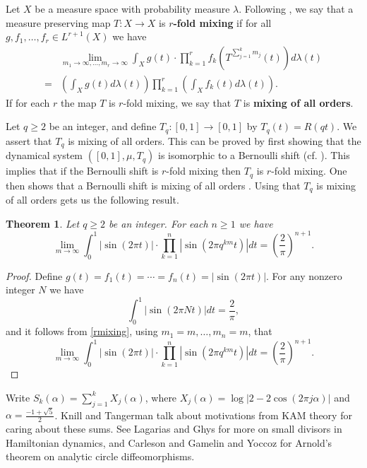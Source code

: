 \documentclass{amsart}
\newtheorem{theorem}{Theorem}
\begin{document}
Let $X$ be a measure space with probability measure $\lambda$. Following  \cite[p.~21, Definition 3.6]{EMS}, we say that a measure preserving map $T:X \to X$ is \textbf{$r$-fold mixing}
if for all $g,f_1,\ldots,f_r \in L^{r+1}(X)$ we have 
\begin{equation}
\begin{split}
&\lim_{m_1 \to \infty,\ldots,m_r \to \infty} \int_X g(t) \cdot \prod_{k=1}^r f_k\left(T^{\sum_{j=1}^k m_j}(t)\right) d\lambda(t)\\
=&\left(\int_X g(t) d\lambda(t)\right) \prod_{k=1}^r \left( \int_X f_k(t) d\lambda(t) \right).
\end{split}
\label{rmixing}
\end{equation}
If for each $r$ the map $T$ is $r$-fold mixing, we say that $T$ is \textbf{mixing of all orders}.

Let $q \geq 2$ be an integer, and define $T_q:[0,1] \to [0,1]$ by 
$T_q(t)=R(qt)$. We assert that $T_q$ is mixing of all orders. This can be proved by first showing that
the dynamical system $([0,1],\mu,T_q)$ is  isomorphic to a Bernoulli shift (cf. \cite[p.~17, Example 2.8]{einsiedler}). This implies that if the Bernoulli shift is $r$-fold mixing then
$T_q$ is $r$-fold mixing. One then shows that a Bernoulli shift is mixing of all orders \cite[p.~53, Exercise 2.7.9]{einsiedler}. Using that $T_q$ is mixing of all orders gets us the following result.

\begin{theorem}
Let $q \geq 2$ be an integer. For each $n \geq 1$ we have
\[
\lim_{m \to \infty} \int_0^1 |\sin(2\pi t)| \cdot \prod_{k=1}^n \left| \sin\left(2\pi q^{km} t\right) \right|  dt
= \left( \frac{2}{\pi} \right)^{n+1}.
\]
\end{theorem}
\begin{proof}
Define
$g(t)=f_1(t)=\cdots=f_n(t)=|\sin(2\pi t)|$. For any nonzero integer $N$ we have
\[
\int_0^1 |\sin(2\pi N t)| dt=\frac{2}{\pi},
\]
and it follows from \eqref{rmixing}, using $m_1=m, \ldots, m_n=m$, that
\[
\lim_{m \to \infty} \int_0^1 |\sin(2\pi t)| \cdot \prod_{k=1}^n \left| \sin\left(2\pi q^{km} t\right) \right|  dt
= \left( \frac{2}{\pi} \right)^{n+1}.
\]
\end{proof}

Write
$S_k(\alpha)=\sum_{j=1}^k X_j(\alpha)$, where $X_j(\alpha)=\log|2-2\cos(2\pi j\alpha)|$ and
$\alpha=\frac{-1+\sqrt{5}}{2}$. 
Knill and Tangerman \cite{tangerman} 
talk about  motivations from KAM theory for caring about these sums. See Lagarias \cite{lagarias} and Ghys \cite{ghys} for more on small divisors in Hamiltonian dynamics, 
and Carleson and Gamelin \cite[p.~48, Theorem 7.2]{carleson} and Yoccoz \cite{yoccoz} for Arnold's theorem on analytic circle diffeomorphisms.
\end{document}
